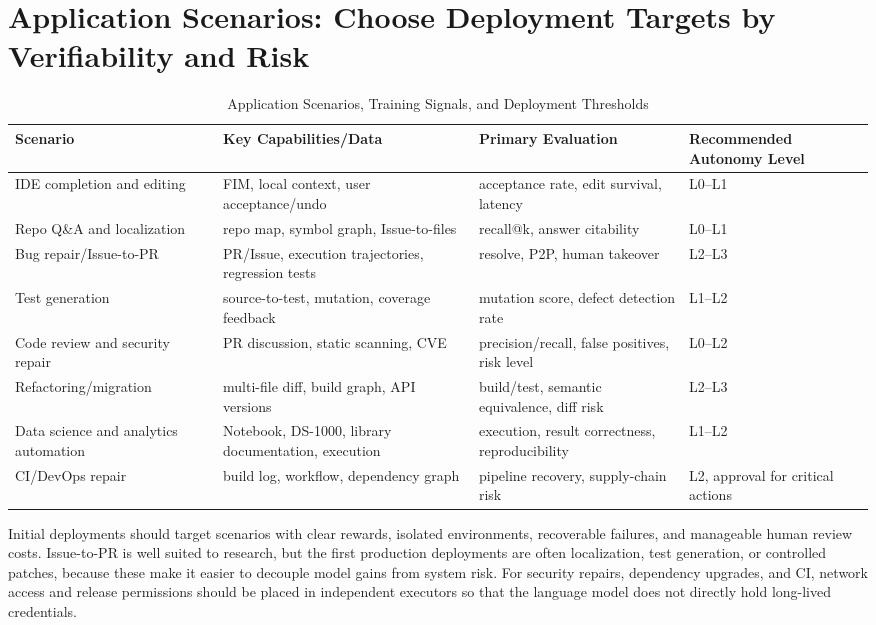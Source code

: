 \documentclass[10pt,a4paper,UTF8,fontset=none]{ctexart}
\begin{document}
\section{Application Scenarios: Choose Deployment Targets by Verifiability and Risk}

\begin{table}[htbp]
\centering
\caption{Application Scenarios, Training Signals, and Deployment Thresholds}
\label{tab:applications}
\small
\begin{tabularx}{\textwidth}{p{3.0cm}YYY}
\toprule
Scenario & Key Capabilities/Data & Primary Evaluation & Recommended Autonomy Level \\
\midrule
IDE completion and editing & FIM, local context, user acceptance/undo & acceptance rate, edit survival, latency & L0--L1 \\
Repo Q\&A and localization & repo map, symbol graph, Issue-to-files & recall@k, answer citability & L0--L1 \\
Bug repair/Issue-to-PR & PR/Issue, execution trajectories, regression tests & resolve, P2P, human takeover & L2--L3 \\
Test generation & source-to-test, mutation, coverage feedback & mutation score, defect detection rate & L1--L2 \\
Code review and security repair & PR discussion, static scanning, CVE & precision/recall, false positives, risk level & L0--L2 \\
Refactoring/migration & multi-file diff, build graph, API versions & build/test, semantic equivalence, diff risk & L2--L3 \\
Data science and analytics automation & Notebook, DS-1000, library documentation, execution & execution, result correctness, reproducibility & L1--L2 \\
CI/DevOps repair & build log, workflow, dependency graph & pipeline recovery, supply-chain risk & L2, approval for critical actions \\
\bottomrule
\end{tabularx}
\end{table}

Initial deployments should target scenarios with clear rewards, isolated environments, recoverable failures, and manageable human review costs. Issue-to-PR is well suited to research, but the first production deployments are often localization, test generation, or controlled patches, because these make it easier to decouple model gains from system risk. For security repairs, dependency upgrades, and CI, network access and release permissions should be placed in independent executors so that the language model does not directly hold long-lived credentials.
\end{document}
